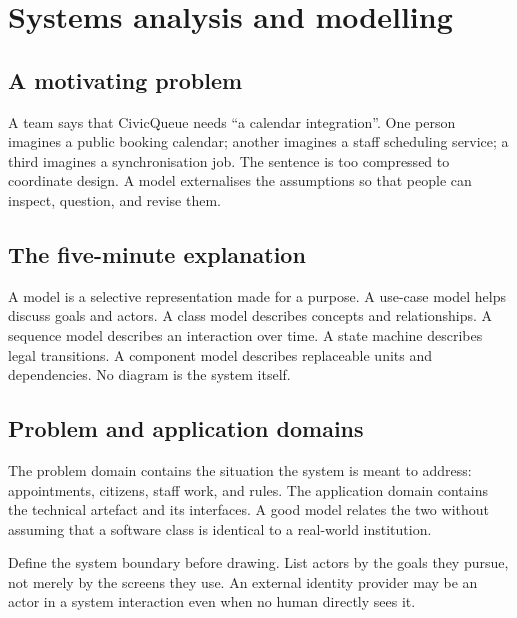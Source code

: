 \chapter{Systems analysis and modelling}
\label{ch:modelling}

\section{A motivating problem}
A team says that CivicQueue needs \enquote{a calendar integration}. One person imagines a public booking calendar; another imagines a staff scheduling service; a third imagines a synchronisation job. The sentence is too compressed to coordinate design. A model externalises the assumptions so that people can inspect, question, and revise them.


\section{The five-minute explanation}
A model is a selective representation made for a purpose. A use-case model helps discuss goals and actors. A class model describes concepts and relationships. A sequence model describes an interaction over time. A state machine describes legal transitions. A component model describes replaceable units and dependencies. No diagram is the system itself.


\section{Problem and application domains}
The problem domain contains the situation the system is meant to address: appointments, citizens, staff work, and rules. The application domain contains the technical artefact and its interfaces. A good model relates the two without assuming that a software class is identical to a real-world institution.

Define the system boundary before drawing. List actors by the goals they pursue, not merely by the screens they use. An external identity provider may be an actor in a system interaction even when no human directly sees it.

